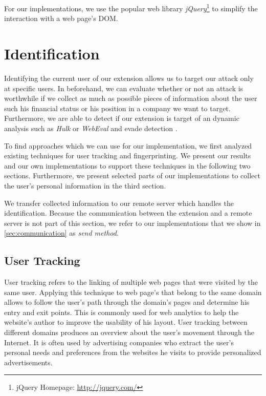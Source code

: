 	For our implementations, we use the popular web library \textit{jQuery}\footnote{jQuery Homepage: \url{http://jquery.com/}} to simplify the interaction with a web page's DOM. 

\newpage	
\section{Identification}
\label{sec:identification} 

	Identifying the current user of our extension allows us to target our attack only at specific users. In beforehand, we can evaluate whether or not an attack is worthwhile if we collect as much as possible pieces of information about the user such his financial status or his position in a company we want to target. Furthermore, we are able to detect if our extension is target of an dynamic analysis such as \textit{Hulk} or \textit{WebEval} and evade detection \cite{184485,190984}.
	
	To find approaches which we can use for our implementation, we first analyzed existing techniques for user tracking and fingerprinting. We present our results and our own implementations to support these techniques in the following two sections. Furthermore, we present selected parts of our implementations to collect the user's personal information in the third section.
	
	We transfer collected information to our remote server which handles the identification. Because the communication between the extension and a remote server is not part of this section, we refer to our implementations that we show in \autoref{sec:communication} as \textit{send method}.
	
\subsection{User Tracking}
\label{sec:userTracking}

	User tracking refers to the linking of multiple web pages that were visited by the same user. Applying this technique to web page's that belong to the same domain allows to follow the user's path through the domain's pages and determine his entry and exit points. This is commonly used for web analytics to help the website's author to improve the usability of his layout. User tracking between different domains produces an overview about the user's movement through the Internet. It is often used by advertising companies who extract the user's personal needs and preferences from the websites he visits to provide personalized advertisements.
		
